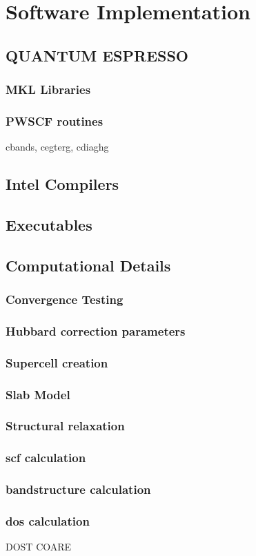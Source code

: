 \chapter{Software Implementation}
    \section{QUANTUM ESPRESSO}
        \subsection{MKL Libraries}
        \subsection{PWSCF routines}
            cbands, cegterg, cdiaghg 
    \section{Intel Compilers}
    \section{Executables}
    \section{Computational Details}
        \subsection{Convergence Testing}
        \subsection{Hubbard correction parameters}
        \subsection{Supercell creation}
        \subsection{Slab Model}
        \subsection{Structural relaxation}
        \subsection{scf calculation}
        \subsection{bandstructure calculation}
        \subsection{dos calculation}

DOST COARE